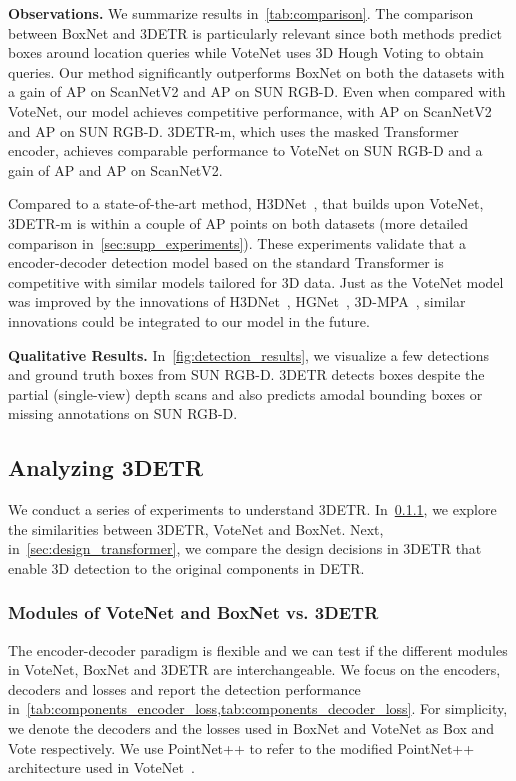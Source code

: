 \documentclass[10pt,twocolumn,letterpaper]{article}
\newcommand{\OURS}{3DETR\xspace}
\newcommand{\OURSm}{3DETR-m\xspace}
\newcommand{\sunrgbd}{SUN RGB-D\xspace}
\newcommand{\scannet}{ScanNetV2\xspace}
\begin{document}
\vspace{0.05in}
\par \noindent \textbf{Observations.}
We summarize results in~\cref{tab:comparison}.
The comparison between BoxNet and \OURS is particularly relevant since both methods predict boxes around location queries while VoteNet uses 3D Hough Voting to obtain queries.
Our method significantly outperforms BoxNet on both the datasets with a gain of  AP on \scannet and  AP on \sunrgbd.
Even when compared with VoteNet, our model achieves competitive performance, with  AP on \scannet and  AP on \sunrgbd.
\OURSm, which uses the masked Transformer encoder, achieves comparable performance to VoteNet on \sunrgbd and a gain of  AP and  AP on \scannet.

Compared to a state-of-the-art method, H3DNet~\cite{zhang2020h3dnet}, that builds upon VoteNet, \OURSm is within a couple of AP points on both datasets (more detailed comparison in~\cref{sec:supp_experiments}).
These experiments validate that a encoder-decoder detection model based on the standard Transformer is competitive with similar models tailored for 3D data.
Just as the VoteNet model was improved by the innovations of H3DNet~\cite{zhang2020h3dnet}, HGNet~\cite{chen2020hierarchical}, 3D-MPA~\cite{engelmann20203d}, similar innovations could be integrated to our model in the future.

\vspace{0.05in}
\par \noindent \textbf{Qualitative Results.} In~\cref{fig:detection_results}, we visualize a few detections and ground truth boxes from \sunrgbd.
\OURS detects boxes despite the partial (single-view) depth scans and also predicts amodal bounding boxes or missing annotations on \sunrgbd.


\subsection{Analyzing \OURS}
\label{sec:analysis}

We conduct a series of experiments to understand \OURS.
In~\cref{sec:components}, we explore the similarities between \OURS, VoteNet and BoxNet.
Next, in~\cref{sec:design_transformer}, we compare the design decisions in \OURS that enable 3D detection to the original components in DETR.

\vspace{-0.1in}
\subsubsection{Modules of VoteNet and BoxNet vs. \OURS}
\label{sec:components}
\vspace{-0.1in}
The encoder-decoder paradigm is flexible and we can test if the different modules in VoteNet, BoxNet and \OURS are interchangeable.
We focus on the encoders, decoders and losses and report the detection performance in~\cref{tab:components_encoder_loss,tab:components_decoder_loss}.
For simplicity, we denote the decoders and the losses used in BoxNet and VoteNet as Box and Vote respectively.
We use PointNet++ to refer to the modified PointNet++ architecture used in VoteNet~\cite{qi2019votenet}.
\end{document}
